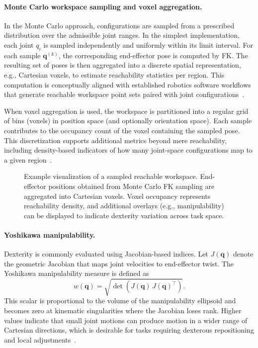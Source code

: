 \paragraph{Monte Carlo workspace sampling and voxel aggregation.}
In the Monte Carlo approach, configurations are sampled from a prescribed distribution over the admissible joint ranges. In the simplest implementation, each joint $q_i$ is sampled independently and uniformly within its limit interval. For each sample $\mathbf{q}^{(k)}$, the corresponding end-effector pose is computed by \ac{FK}. The resulting set of poses is then aggregated into a discrete spatial representation, e.g., Cartesian voxels, to estimate reachability statistics per region. This computation is conceptually aligned with established robotics software workflows that generate reachable workspace point sets paired with joint configurations~\cite{mathworks_generaterobotworkspace}.

When voxel aggregation is used, the workspace is partitioned into a regular grid of bins (voxels) in position space (and optionally orientation space). Each sample contributes to the occupancy count of the voxel containing the sampled pose. This discretization supports additional metrics beyond mere reachability, including density-based indicators of how many joint-space configurations map to a given region~\cite{Dong2013WorkspaceDensity}.

\begin{figure}[ht!]
\centering
{}
\caption[Workspace voxel map]{Example visualization of a sampled reachable workspace. End-effector positions obtained from Monte Carlo \ac{FK} sampling are aggregated into Cartesian voxels. Voxel occupancy represents reachability density, and additional overlays (e.g., manipulability) can be displayed to indicate dexterity variation across task space.}\label{fig:workspace_voxels}
\end{figure}

\paragraph{Yoshikawa manipulability.}
Dexterity is commonly evaluated using Jacobian-based indices. Let $J(\mathbf{q})$ denote the geometric Jacobian that maps joint velocities to end-effector twist. The Yoshikawa manipulability measure is defined as~\cite{Yoshikawa1985Manipulability}
\begin{equation}
w(\mathbf{q}) = \sqrt{\det\left(J(\mathbf{q})\,J(\mathbf{q})^\top\right)}.
\label{eq:yoshikawa_manipulability}
\end{equation}
This scalar is proportional to the volume of the manipulability ellipsoid and becomes zero at kinematic singularities where the Jacobian loses rank. Higher values indicate that small joint motions can produce motion in a wider range of Cartesian directions, which is desirable for tasks requiring dexterous repositioning and local adjustments~\cite{Yoshikawa1985Manipulability}.

